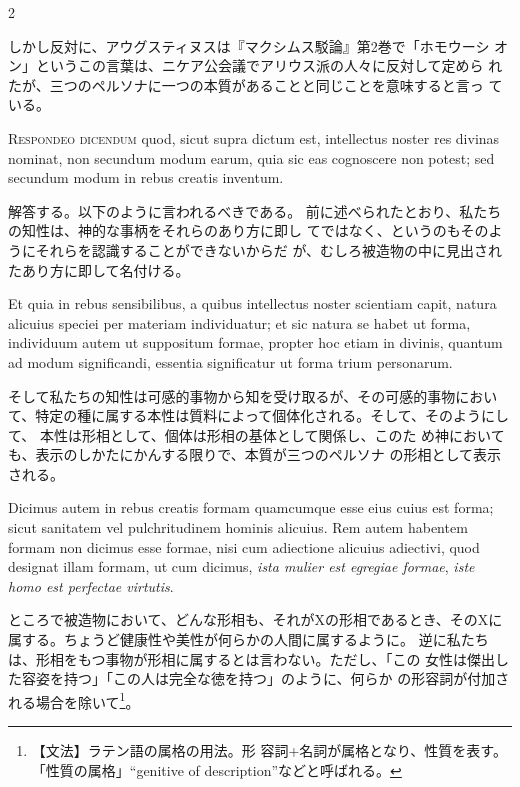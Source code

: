 \documentclass[paper=a4paper,fontsize=10pt,jafontsize=9pt,titlepage]{jlreq}
\begin{document}
\begin{paracol}{2}
\switchcolumn

しかし反対に、アウグスティヌスは『マクシムス駁論』第2巻で「ホモウーシ
 オン」というこの言葉は、ニケア公会議でアリウス派の人々に反対して定めら
 れたが、三つのペルソナに一つの本質があることと同じことを意味すると言っ
 ている。

\switchcolumn*

{\scshape Respondeo dicendum} quod, sicut supra dictum est, intellectus noster res
divinas nominat, non secundum modum earum, quia sic eas cognoscere non
potest; sed secundum modum in rebus creatis inventum.

\switchcolumn

解答する。以下のように言われるべきである。
前に述べられたとおり、私たちの知性は、神的な事柄をそれらのあり方に即し
 てではなく、というのもそのようにそれらを認識することができないからだ
 が、むしろ被造物の中に見出されたあり方に即して名付ける。

\switchcolumn*

Et quia in rebus
sensibilibus, a quibus intellectus noster scientiam capit, natura
alicuius speciei per materiam individuatur; et sic natura se habet ut
forma, individuum autem ut suppositum formae, propter hoc etiam in
divinis, quantum ad modum significandi, essentia significatur ut forma
trium personarum.

\switchcolumn

そして私たちの知性は可感的事物から知を受け取るが、その可感的事物におい
 て、特定の種に属する本性は質料によって個体化される。そして、そのようにして、
 本性は形相として、個体は形相の基体として関係し、このた
 め神においても、表示のしかたにかんする限りで、本質が三つのペルソナ
 の形相として表示される。

\switchcolumn*

Dicimus autem in rebus creatis formam quamcumque esse
eius cuius est forma; sicut sanitatem vel pulchritudinem hominis
alicuius. 
Rem autem habentem formam non dicimus esse formae, nisi cum
adiectione alicuius adiectivi, quod designat illam formam, ut cum
dicimus, {\itshape ista mulier est egregiae formae}, {\itshape iste homo est perfectae
virtutis}.

\switchcolumn

ところで被造物において、どんな形相も、それがXの形相であるとき、そのXに
 属する。ちょうど健康性や美性が何らかの人間に属するように。
逆に私たちは、形相をもつ事物が形相に属するとは言わない。ただし、「この
女性は傑出した容姿を持つ」「この人は完全な徳を持つ」のように、何らか
 の形容詞が付加される場合を除いて\footnote{【文法】ラテン語の属格の用法。形
 容詞+名詞が属格となり、性質を表す。「性質の属格」``genitive of
 description''などと呼ばれる。}。


\end{paracol}
\end{document}
